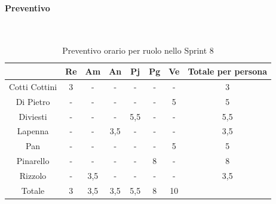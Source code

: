 \documentclass{article}
\begin{document}
                \paragraph{Preventivo}\mbox{}\\
                \begin{table}[H]
                    \centering
                    \begin{tabular}{|c|c|c|c|c|c|c|c|}
                    \hline
                                  & Re  & Am  & An  & Pj  & Pg  & Ve  & Totale per persona \\ \hline
                    Cotti Cottini & 3   & -   & -   & -   & -   & -   & 3                  \\ \hline
                    Di Pietro     & -   & -   & -   & -   & -   & 5   & 5                  \\ \hline
                    Diviesti      & -   & -   & -   & 5,5 & -   & -   & 5,5                \\ \hline
                    Lapenna       & -   & -   & 3,5 & -   & -   & -   & 3,5                \\ \hline
                    Pan           & -   & -   & -   & -   & -   & 5   & 5                  \\ \hline
                    Pinarello     & -   & -   & -   & -   & 8  & -   & 8                 \\ \hline
                    Rizzolo       & -   & 3,5 & -   & -   & -   & -   & 3,5                \\ \hline
                    Totale        & 3   & 3,5 & 3,5 & 5,5 & 8  & 10  &                    \\ \hline
                    \end{tabular}
                    \caption{Preventivo orario per ruolo nello Sprint 8}
                \end{table}

\end{document}
